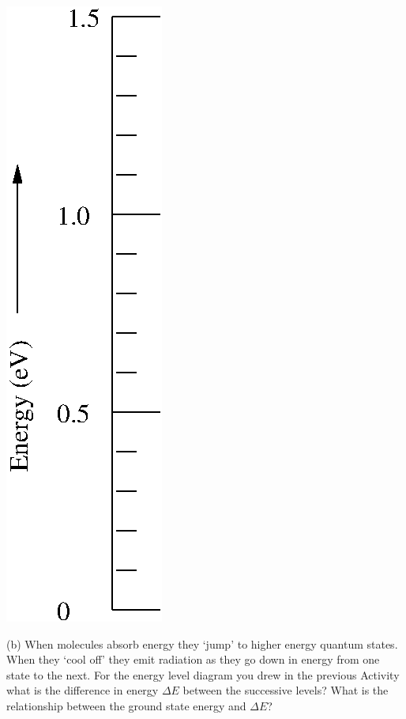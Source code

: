 \hspace{1.0cm}\includegraphics{solveSE/energyLevels2.eps}

\vspace{0.5in}

(b) When molecules absorb energy they `jump' to higher energy quantum states.
When they `cool off' they emit radiation as they go down in energy from one state to 
the next. For the energy level diagram you drew in the previous Activity what is the difference 
in energy $\Delta E$ between the successive levels? What is the relationship between
the ground state energy and $\Delta E$?

\vspace{4.0cm}

\newpage

